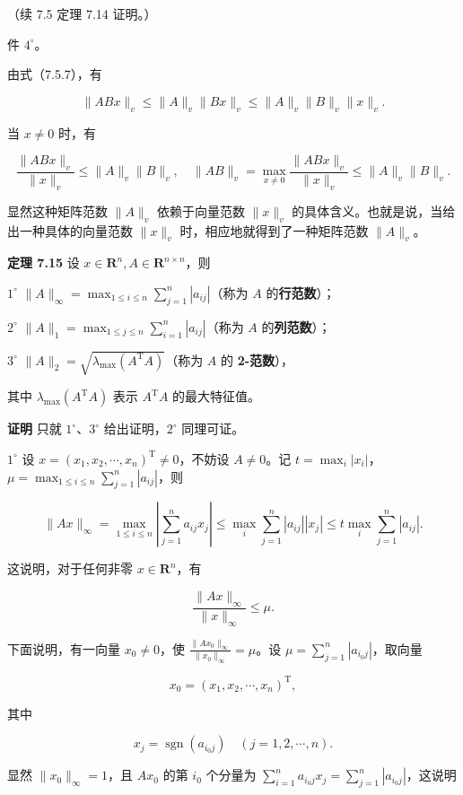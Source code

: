\documentclass[
  10pt,
  fontset=fandol]{ctexart}
\begin{document}
（续 7.5 定理 7.14 证明。）

件 \(4^\circ\)。

由式（7.5.7），有

\[
\|ABx\|_v\leqslant\|A\|_v\|Bx\|_v\leqslant\|A\|_v\|B\|_v\|x\|_v.
\]

当 \(x\neq0\) 时，有

\[
\frac{\|ABx\|_v}{\|x\|_v}\leqslant\|A\|_v\|B\|_v,\quad
\|AB\|_v=\max_{x\neq0}\frac{\|ABx\|_v}{\|x\|_v}\leqslant\|A\|_v\|B\|_v.
\]

显然这种矩阵范数 \(\|A\|_v\) 依赖于向量范数 \(\|x\|_v\) 的具体含义。也就是说，当给出一种具体的向量范数 \(\|x\|_v\) 时，相应地就得到了一种矩阵范数 \(\|A\|_v\)。

\textbf{定理 7.15} 设 \(x\in\mathbf R^n,A\in\mathbf R^{n\times n}\)，则

\(1^\circ\) \(\|A\|_\infty=\max_{1\leqslant i\leqslant n}\sum_{j=1}^{n}|a_{ij}|\)（称为 \(A\) 的\textbf{行范数}）；

\(2^\circ\) \(\|A\|_1=\max_{1\leqslant j\leqslant n}\sum_{i=1}^{n}|a_{ij}|\)（称为 \(A\) 的\textbf{列范数}）；

\(3^\circ\) \(\|A\|_2=\sqrt{\lambda_{\max}(A^{\mathrm T}A)}\)（称为 \(A\) 的 \textbf{2-范数}），

其中 \(\lambda_{\max}(A^{\mathrm T}A)\) 表示 \(A^{\mathrm T}A\) 的最大特征值。

\textbf{证明} 只就 \(1^\circ\)、\(3^\circ\) 给出证明，\(2^\circ\) 同理可证。

\(1^\circ\) 设 \(x=(x_1,x_2,\cdots,x_n)^{\mathrm T}\neq0\)，不妨设 \(A\neq0\)。记 \(t=\max_i|x_i|\)，\(\mu=\max_{1\leqslant i\leqslant n}\sum_{j=1}^{n}|a_{ij}|\)，则

\[
\|Ax\|_\infty
=\max_{1\leqslant i\leqslant n}\left|\sum_{j=1}^{n}a_{ij}x_j\right|
\leqslant\max_i\sum_{j=1}^{n}|a_{ij}||x_j|
\leqslant t\max_i\sum_{j=1}^{n}|a_{ij}|.
\]

这说明，对于任何非零 \(x\in\mathbf R^n\)，有

\[
\frac{\|Ax\|_\infty}{\|x\|_\infty}\leqslant\mu.
\tag{7.5.8}
\]

下面说明，有一向量 \(x_0\neq0\)，使 \(\frac{\|Ax_0\|_\infty}{\|x_0\|_\infty}=\mu\)。设 \(\mu=\sum_{j=1}^{n}|a_{i_0j}|\)，取向量

\[
x_0=(x_1,x_2,\cdots,x_n)^{\mathrm T},
\]

其中

\[
x_j=\operatorname{sgn}(a_{i_0j})\quad(j=1,2,\cdots,n).
\]

显然 \(\|x_0\|_\infty=1\)，且 \(Ax_0\) 的第 \(i_0\) 个分量为 \(\sum_{i=1}^{n}a_{i_0j}x_j=\sum_{j=1}^{n}|a_{i_0j}|\)，这说明
\end{document}
